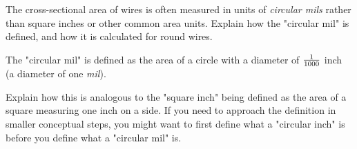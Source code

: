 

The cross-sectional area of wires is often measured in units of {\it circular mils} rather than square inches or other common area units.  Explain how the "circular mil" is defined, and how it is calculated for round wires.







The "circular mil" is defined as the area of a circle with a diameter of ${1 \over 1000}$ inch (a diameter of one {\it mil}).







Explain how this is analogous to the "square inch" being defined as the area of a square measuring one inch on a side.  If you need to approach the definition in smaller conceptual steps, you might want to first define what a "circular inch" is before you define what a "circular mil" is.




